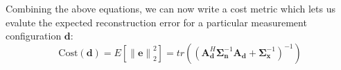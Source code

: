 \documentclass{article}
\providecommand{\norm}[1]{\left\lVert#1\right\rVert}
\begin{document}
Combining the above equations, we can now write a cost metric which lets us evalute
the expected reconstruction error for a particular measurement configuration $\bm{d}$:
\begin{equation}
\text{Cost}(\bm{d}) = E[\norm{\bm{e}}_2^2] = tr\left(\left( \bm{A}_{\bm{d}}^H\bm{\Sigma}_{\bm{n}}^{-1} \bm{A}_{\bm{d}} +
    \bm{\Sigma}_{\bm{x}}^{-1}\right)^{-1}\right)
\end{equation}



\end{document}
